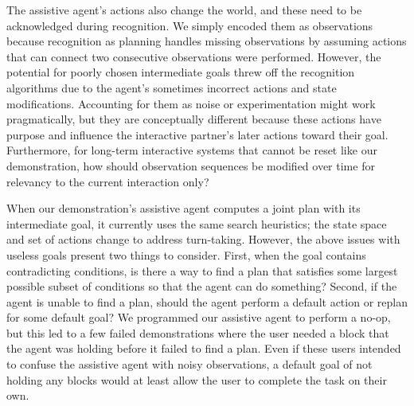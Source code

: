 \documentclass[letterpaper]{article} %
\begin{document}
The assistive agent's actions also change the world, and these need to be acknowledged during recognition.  We simply encoded them as observations because recognition as planning handles missing observations by assuming actions %
 that can connect two consecutive observations %
 were performed.  However, the potential for poorly chosen intermediate goals %
 threw off the recognition algorithms due to the agent's sometimes incorrect actions and state modifications.  Accounting for them as noise or experimentation might work pragmatically, but they are conceptually different because these actions have purpose and influence the interactive partner's later actions toward their goal.  Furthermore, for long-term interactive systems that cannot be reset like our demonstration, how should observation sequences be modified over time for relevancy to the current interaction only?

When our demonstration's assistive agent computes a joint plan with its intermediate goal, it currently uses the same search heuristics; the state space and set of actions change to address turn-taking.  However, the above issues with useless goals present two things to consider.  First, when the goal contains contradicting conditions, is there a way to find a plan that satisfies some largest possible subset of conditions so that the agent can do something?  Second, if the agent is unable to find a plan, should the agent perform a default action or replan for some default goal?  We programmed our assistive agent to perform a no-op, but this led to a few failed demonstrations where the user needed a block that the agent was holding before it failed to find a plan.  Even if these users intended to confuse the assistive agent with noisy observations, a default goal of %
 not holding any blocks would at least allow the user to complete the task on their own. %



\end{document}
